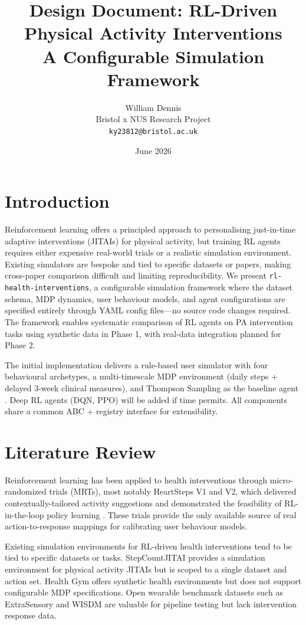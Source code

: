 \documentclass[11pt,a4paper]{article}
\title{Design Document: RL-Driven Physical Activity Interventions\\
\large A Configurable Simulation Framework}
\author{William Dennis\\
Bristol x NUS Research Project\\
\texttt{ky23812@bristol.ac.uk}}
\date{June 2026}
\begin{document}
\maketitle
\tableofcontents

\newpage

\section{Introduction}
\label{sec:intro}

Reinforcement learning offers a principled approach to personalising
just-in-time adaptive interventions (JITAIs) for physical activity, but
training RL agents requires either expensive real-world trials or a realistic
simulation environment. Existing simulators are bespoke and tied to specific
datasets or papers, making cross-paper comparison difficult and limiting
reproducibility. We present \texttt{rl-health-interventions}, a configurable
simulation framework where the dataset schema, MDP dynamics, user behaviour
models, and agent configurations are specified entirely through YAML config
files---no source code changes required. The framework enables systematic
comparison of RL agents on PA intervention tasks using synthetic data in
Phase 1, with real-data integration planned for Phase 2.

The initial implementation delivers a rule-based user simulator with four
behavioural archetypes, a multi-timescale MDP environment (daily steps +
delayed 3-week clinical measures), and Thompson Sampling as the baseline
agent \cite{karine2024stepcountjitai,klasnja2019heartsteps}. Deep RL agents
(DQN, PPO) will be added if time permits. All
components share a common ABC + registry interface for extensibility.

\section{Literature Review}
\label{sec:lit}

Reinforcement learning has been applied to health interventions through
micro-randomized trials (MRTs), most notably HeartSteps V1 and V2, which
delivered contextually-tailored activity suggestions and demonstrated the
feasibility of RL-in-the-loop policy learning \cite{klasnja2019heartsteps,
klasnja2022heartsteps}. These trials provide the only available source of
real action-to-response mappings for calibrating user behaviour models.

Existing simulation environments for RL-driven health interventions tend to
be tied to specific datasets or tasks. StepCountJITAI \cite{karine2024stepcountjitai}
provides a simulation environment for physical activity JITAIs but is scoped
to a single dataset and action set. Health Gym \cite{gateno2023healthgym}
offers synthetic health environments but does not support configurable MDP
specifications. Open wearable benchmark datasets such as ExtraSensory
\cite{vaizman2017extrasensory} and WISDM \cite{kwapisz2011wisdm} are
valuable for pipeline testing but lack intervention response data.
\end{document}
